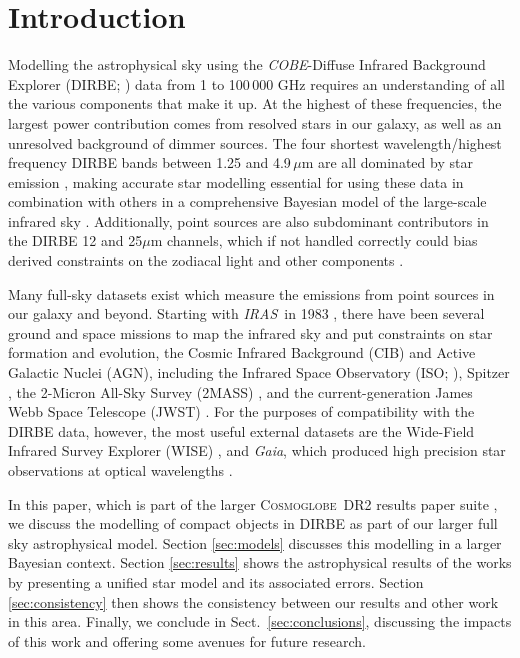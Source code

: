 \documentclass{aa}
\def\Cosmoglobe{\textsc{Cosmoglobe}}
\def\COBE{\textit{COBE}}
\def\GAIA{\textit{Gaia}}
\def\IRAS{\textit{{IRAS}}}
\begin{document}
\setcounter{tocdepth}{2}
   
\section{Introduction}

Modelling the astrophysical sky using the \COBE-Diffuse Infrared Background Explorer (DIRBE; \citealp{DIRBE}) data from 1 to 100\,000 GHz requires an understanding of all the various components that make it up. At the highest of these frequencies, the largest power contribution comes from resolved stars in our galaxy, as well as an unresolved background of dimmer sources. The four shortest wavelength/highest frequency DIRBE bands between 1.25 and 4.9\,$\mu$m are all dominated by star emission \citep{arendt1998}, making accurate star modelling essential for using these data in combination with others in a comprehensive Bayesian model of the large-scale infrared sky \citep{CG02_01}. Additionally, point sources are also subdominant contributors in the DIRBE 12 and 25$\mu$m channels, which if not handled correctly could bias derived constraints on the zodiacal light and other components \citep{K98,CG02_02}.

Many full-sky datasets exist which measure the emissions from point sources in our galaxy and beyond. Starting with \IRAS\ in 1983 \citep{neugebauer:1984}, there have been several ground and space missions to map the infrared sky and put constraints on star formation and evolution, the Cosmic Infrared Background (CIB) and Active Galactic Nuclei (AGN), including the Infrared Space Observatory (ISO; \citealp{iso}), Spitzer \citep{spitzer}, the 2-Micron All-Sky Survey (2MASS) \citep{2mass}, and the current-generation James Webb Space Telescope (JWST) \citep{jwst}. For the purposes of compatibility with the DIRBE data, however, the most useful external datasets are the Wide-Field Infrared Survey Explorer (WISE) \citep{wise}, and \GAIA, which produced high precision star observations at optical wavelengths \citep{gaia, gaia2}. 

In this paper, which is part of the larger \Cosmoglobe\ DR2 results paper suite \citep[][and references therein]{CG02_01}, we discuss the modelling of compact objects in DIRBE as part of our larger full sky astrophysical model. Section \ref{sec:models} discusses this modelling in a larger Bayesian context. Section \ref{sec:results} shows the astrophysical results of the works by presenting a unified star model and its associated errors. Section \ref{sec:consistency} then shows the consistency between our results and other work in this area. Finally, we conclude in Sect.~\ref{sec:conclusions}, discussing the impacts of this work and offering some avenues for future research.
\end{document}
